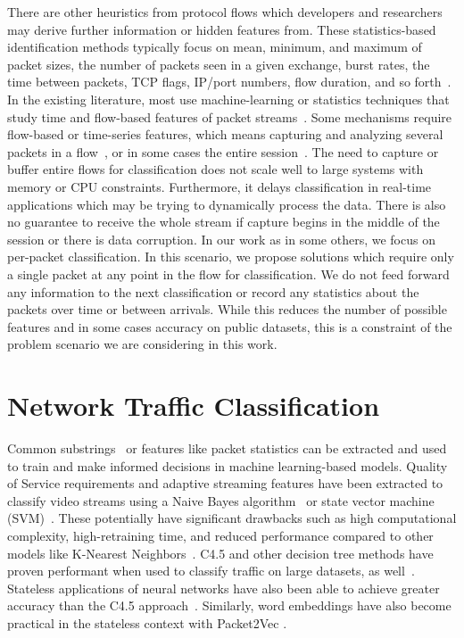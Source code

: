 There are other heuristics from protocol flows which developers and researchers may derive further information or hidden features from. These statistics-based identification methods typically focus on mean, minimum, and maximum of packet sizes, the number of packets seen in a given exchange, burst rates, the time between packets, TCP flags, IP/port numbers, flow duration, and so forth~\cite{Moore2013DiscriminatorsFU, ZHAO202122, Paxson}.
In the existing literature, most use machine-learning or statistics techniques that study time and flow-based features of packet streams~\cite{Salman, Cao, Lim, LiZ, Song2019, iscx-vpn-paper, iscx-tor-paper}. Some mechanisms require flow-based or time-series features, which means capturing and analyzing several packets in a flow~\cite{onlyheader, zhou2018encrypted}, or in some cases the entire session~\cite{perera2017comparison, deeppacket, panchenko2011website, amaral2016machine, cao2014survey, ibrahim2016internet, fan2017investigation, sun2018internet}. The need to capture or buffer entire flows for classification does not scale well to large systems with memory or CPU constraints. Furthermore, it delays classification in real-time applications which may be trying to dynamically process the data. There is also no guarantee to receive the whole stream if capture begins in the middle of the session or there is data corruption. In our work as in some others, we focus on per-packet classification. In this scenario, we propose solutions which require only a single packet at any point in the flow for classification. We do not feed forward any information to the next classification or record any statistics about the packets over time or between arrivals. While this reduces the number of possible features and in some cases accuracy on public datasets, this is a constraint of the problem scenario we are considering in this work.

\section{Network Traffic Classification}

Common substrings~\cite{sigbox} or features like packet statistics can be extracted and used to train and make informed decisions in machine learning-based models. Quality of Service requirements and adaptive streaming features have been extracted to classify video streams using a Naive Bayes algorithm~\cite{DIAS2019143} or state vector machine (SVM)~\cite{LiZ, Cao}. These potentially have significant drawbacks such as high computational complexity, high-retraining time, and reduced performance compared to other models like K-Nearest Neighbors~\cite{Salman}. C4.5 and other decision tree methods have proven performant when used to classify traffic on large datasets, as well~\cite{Yuan, iscx-vpn-paper}. Stateless applications of neural networks have also been able to achieve greater accuracy than the C4.5 approach~\cite{deeppacket}. Similarly, word embeddings have also become practical in the stateless context with Packet2Vec \cite{packet2vec}.

